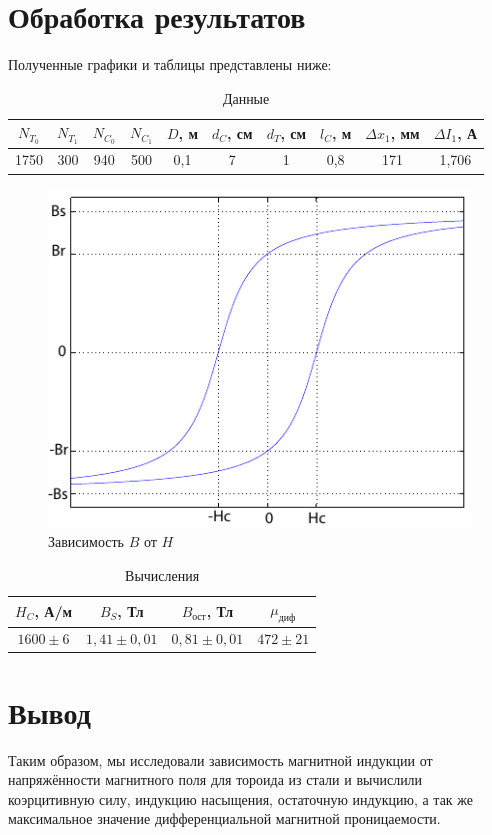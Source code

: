 \documentclass[a4paper,12pt]{article}
\begin{document}
	\section*{Обработка результатов}
		Полученные графики и таблицы представлены ниже:
		\begin{table}[H]
			\caption{Данные}
			\label{table:D}
			\begin{tabular}{|c|c|c|c|c|c|c|c|c|c|}
				\hline
				$N_{T_0}$ & $N_{T_1}$ & $N_{C_0}$ & $N_{C_1}$ & $D$, м & $d_C$, см & $d_T$, см & $l_C$, м & $\Delta x_1$, мм & $\Delta I_1$, А \\ \hline
				1750 & 300 & 940 & 500 & 0,1 & 7 & 1& 0,8 & 171 & 1,706 \\ \hline
			\end{tabular}
		\end{table}
		\begin{figure}[H]
			\caption{Зависимость $B$ от $H$}
			\label{ris:BH}
			\includegraphics[scale = 0.7]{BH.pdf}
		\end{figure}
		\begin{table}[H]
			\caption{Вычисления}
			\label{table:Q}
			\begin{tabular}{|c|c|c|c|}
				\hline
				$H_C$, А/м & $B_S$, Тл  & $B_{ост}$, Тл & $\mu_{диф}$  \\ \hline
				$1600\pm 6$  & $1,41 \pm 0,01$ & $0,81\pm 0,01$ & $472 \pm 21$  \\ \hline
			\end{tabular}
		\end{table}
		
		\section*{Вывод}
			Таким образом, мы исследовали зависимость магнитной индукции от напряжённости магнитного поля для тороида из стали и вычислили коэрцитивную силу, индукцию насыщения, остаточную индукцию, а так же максимальное значение дифференциальной магнитной проницаемости.
			
\end{document}
